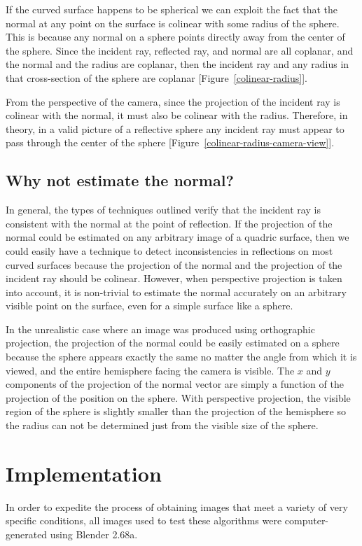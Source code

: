 \documentclass{thesis}
\begin{document}
If the curved surface happens to be spherical we can exploit the fact that the normal at any point on the surface is colinear with some radius of the sphere. This is because any normal on a sphere points directly away from the center of the sphere. Since the incident ray, reflected ray, and normal are all coplanar, and the normal and the radius are coplanar, then the incident ray and any radius in that cross-section of the sphere are coplanar [Figure~\ref{colinear-radius}].

From the perspective of the camera, since the projection of the incident ray is colinear with the normal, it must also be colinear with the radius. Therefore, in theory, in a valid picture of a reflective sphere any incident ray must appear to pass through the center of the sphere [Figure~\ref{colinear-radius-camera-view}].

\section{Why not estimate the normal?}
In general, the types of techniques outlined verify that the incident ray is consistent with the normal at the point of reflection. If the projection of the normal could be estimated on any arbitrary image of a quadric surface, then we could easily have a technique to detect inconsistencies in reflections on most curved surfaces because the projection of the normal and the projection of the incident ray should be colinear. However, when perspective projection is taken into account, it is non-trivial to estimate the normal accurately on an arbitrary visible point on the surface, even for a simple surface like a sphere.

In the unrealistic case where an image was produced using orthographic projection, the projection of the normal could be easily estimated on a sphere because the sphere appears exactly the same no matter the angle from which it is viewed, and the entire hemisphere facing the camera is visible. The $x$ and $y$ components of the projection of the normal vector are simply a function of the projection of the position on the sphere. With perspective projection, the visible region of the sphere is slightly smaller than the projection of the hemisphere so the radius can not be determined just from the visible size of the sphere.

\chapter{Implementation}
In order to expedite the process of obtaining images that meet a variety of very specific conditions, all images used to test these algorithms were computer-generated using Blender 2.68a.
\end{document}
